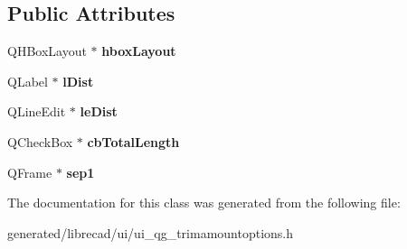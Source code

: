 \subsection*{Public Attributes}
\begin{DoxyCompactItemize}
\item 
\hypertarget{classUi__QG__TrimAmountOptions_ac708dbfb61603d1b35ff0b9858952519}{Q\-H\-Box\-Layout $\ast$ {\bfseries hbox\-Layout}}\label{classUi__QG__TrimAmountOptions_ac708dbfb61603d1b35ff0b9858952519}

\item 
\hypertarget{classUi__QG__TrimAmountOptions_a0a5e938d05db8f49dbf99de37d65042a}{Q\-Label $\ast$ {\bfseries l\-Dist}}\label{classUi__QG__TrimAmountOptions_a0a5e938d05db8f49dbf99de37d65042a}

\item 
\hypertarget{classUi__QG__TrimAmountOptions_a83a8f1847591c57239741869c1b7618d}{Q\-Line\-Edit $\ast$ {\bfseries le\-Dist}}\label{classUi__QG__TrimAmountOptions_a83a8f1847591c57239741869c1b7618d}

\item 
\hypertarget{classUi__QG__TrimAmountOptions_aaca874600b678bab7f4e73e4e947af00}{Q\-Check\-Box $\ast$ {\bfseries cb\-Total\-Length}}\label{classUi__QG__TrimAmountOptions_aaca874600b678bab7f4e73e4e947af00}

\item 
\hypertarget{classUi__QG__TrimAmountOptions_a576ac8a899b6644f6783025c466e16b9}{Q\-Frame $\ast$ {\bfseries sep1}}\label{classUi__QG__TrimAmountOptions_a576ac8a899b6644f6783025c466e16b9}

\end{DoxyCompactItemize}


The documentation for this class was generated from the following file\-:\begin{DoxyCompactItemize}
\item 
generated/librecad/ui/ui\-\_\-qg\-\_\-trimamountoptions.\-h\end{DoxyCompactItemize}
